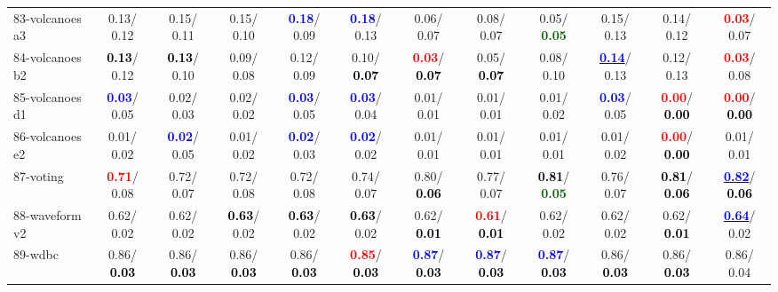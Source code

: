 \begin{table}[h]
\begin{center}
{\begin{tabular}{lc|c|c|c|c|c|c|c|c|c|c}
83-volcanoes a3 &   0.13/  0.12 &   0.15/  0.11 &   0.15/  0.10 & \textcolor{blue}{\textbf{  0.18}}/  0.09 & \textcolor{blue}{\textbf{  0.18}}/  0.13 &   0.06/  0.07 &   0.08/  0.07 &   0.05/\textcolor{darkgreen}{\textbf{  0.05}} &   0.15/  0.13 &   0.14/  0.12 & \textcolor{red}{\textbf{  0.03}}/  0.07 \\
84-volcanoes b2 & \textcolor{black}{\textbf{  0.13}}/  0.12 & \textcolor{black}{\textbf{  0.13}}/  0.10 &   0.09/  0.08 &   0.12/  0.09 &   0.10/\textcolor{black}{\textbf{  0.07}} & \textcolor{red}{\textbf{  0.03}}/\textcolor{black}{\textbf{  0.07}} &   0.05/\textcolor{black}{\textbf{  0.07}} &   0.08/  0.10 & \underline{\textcolor{blue}{\textbf{  0.14}}}/  0.13 &   0.12/  0.13 & \textcolor{red}{\textbf{  0.03}}/  0.08 \\
85-volcanoes d1 & \textcolor{blue}{\textbf{  0.03}}/  0.05 &   0.02/  0.03 &   0.02/  0.02 & \textcolor{blue}{\textbf{  0.03}}/  0.05 & \textcolor{blue}{\textbf{  0.03}}/  0.04 &   0.01/  0.01 &   0.01/  0.01 &   0.01/  0.02 & \textcolor{blue}{\textbf{  0.03}}/  0.05 & \textcolor{red}{\textbf{  0.00}}/\textcolor{black}{\textbf{  0.00}} & \textcolor{red}{\textbf{  0.00}}/\textcolor{black}{\textbf{  0.00}} \\ \hline
86-volcanoes e2 &   0.01/  0.02 & \textcolor{blue}{\textbf{  0.02}}/  0.05 &   0.01/  0.02 & \textcolor{blue}{\textbf{  0.02}}/  0.03 & \textcolor{blue}{\textbf{  0.02}}/  0.02 &   0.01/  0.01 &   0.01/  0.01 &   0.01/  0.01 &   0.01/  0.02 & \textcolor{red}{\textbf{  0.00}}/\textcolor{black}{\textbf{  0.00}} &   0.01/  0.01 \\
87-voting & \textcolor{red}{\textbf{  0.71}}/  0.08 &   0.72/  0.07 &   0.72/  0.08 &   0.72/  0.08 &   0.74/  0.07 &   0.80/\textcolor{black}{\textbf{  0.06}} &   0.77/  0.07 & \textcolor{black}{\textbf{  0.81}}/\textcolor{darkgreen}{\textbf{  0.05}} &   0.76/  0.07 & \textcolor{black}{\textbf{  0.81}}/\textcolor{black}{\textbf{  0.06}} & \underline{\textcolor{blue}{\textbf{  0.82}}}/\textcolor{black}{\textbf{  0.06}} \\
88-waveform v2 &   0.62/  0.02 &   0.62/  0.02 & \textcolor{black}{\textbf{  0.63}}/  0.02 & \textcolor{black}{\textbf{  0.63}}/  0.02 & \textcolor{black}{\textbf{  0.63}}/  0.02 &   0.62/\textcolor{black}{\textbf{  0.01}} & \textcolor{red}{\textbf{  0.61}}/\textcolor{black}{\textbf{  0.01}} &   0.62/  0.02 &   0.62/  0.02 &   0.62/\textcolor{black}{\textbf{  0.01}} & \underline{\textcolor{blue}{\textbf{  0.64}}}/  0.02 \\
89-wdbc &   0.86/\textcolor{black}{\textbf{  0.03}} &   0.86/\textcolor{black}{\textbf{  0.03}} &   0.86/\textcolor{black}{\textbf{  0.03}} &   0.86/\textcolor{black}{\textbf{  0.03}} & \textcolor{red}{\textbf{  0.85}}/\textcolor{black}{\textbf{  0.03}} & \textcolor{blue}{\textbf{  0.87}}/\textcolor{black}{\textbf{  0.03}} & \textcolor{blue}{\textbf{  0.87}}/\textcolor{black}{\textbf{  0.03}} & \textcolor{blue}{\textbf{  0.87}}/\textcolor{black}{\textbf{  0.03}} &   0.86/\textcolor{black}{\textbf{  0.03}} &   0.86/\textcolor{black}{\textbf{  0.03}} &   0.86/  0.04 \\

\end{tabular}}
\end{center}
\end{table}
